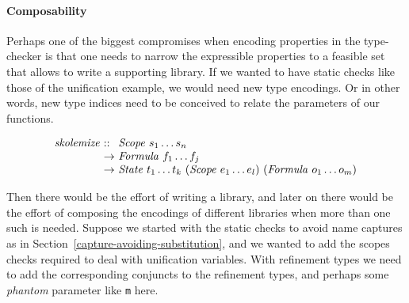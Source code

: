 \documentclass[sigconf, review]{acmart}
\newcommand{\tc}[1]{{\small\texttt{#1}}}
\begin{document}



\paragraph{Composability} Perhaps one of the biggest compromises when encoding properties in the type-checker
is that one needs to narrow the expressible properties to a feasible set that allows
to write a supporting library. If we wanted to have static checks like those of the
unification example, we would need new type encodings. Or in other words, new type indices
need to be conceived to relate the parameters of our functions.

$$\begin{array}{l@{\ }l@{\ }l}
    \mathit{skolemize} & \mathit{::}  & \mathit{Scope}\ s_1 \ldots s_n \\
                       & \rightarrow  & \mathit{Formula}\ f_1 \ldots f_j \\
                       & \rightarrow  & \mathit{State}\ t_1 \ldots t_k\ (\mathit{Scope}\ e_1 \ldots e_l)\ (\mathit{Formula}\ o_1 \ldots o_m)
\end{array}$$


Then there would be the effort of writing a library, and later on there would be the
effort of composing the encodings of different libraries when more than one such
is needed. Suppose we started with the static checks to avoid name captures as in
Section~\ref{capture-avoiding-substitution}, and we wanted to add the scopes checks
required to deal with unification variables. With refinement types we need to add
the corresponding conjuncts to the refinement types, and perhaps some \textit{phantom}
parameter like \tc{m} here.
\end{document}
